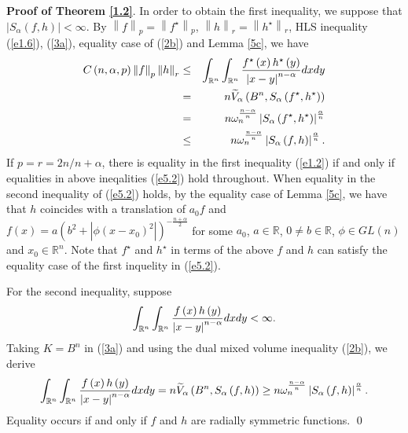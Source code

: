 \documentclass[preprint,12pt]{elsarticle}
\begin{document}
\noindent\textbf{Proof of Theorem \ref{1.2}}.
In order to obtain the first inequality, we suppose that $\left | S_{\alpha }\left ( f,h \right )   \right |< \infty $. By $\left \| f \right \|_{p}=\left \| f^{\star }  \right \|_{p}$, $\left \| h \right \|_{r}=\left \| h^{\star }  \right \|_{r} $, HLS inequality (\ref{e1.6}), (\ref{3a}), equality case of (\ref{2b}) and Lemma \ref{5c}, we have
\begin{eqnarray}\label{e5.2}
C\left ( n,\alpha ,p \right )\left \| f \right \|_{p}\left \| h \right \|_{r}&\le&\int_{\mathbb{R}^n}\int_{\mathbb{R}^n}\frac{f^{\star } \left ( x \right )h^{\star } \left ( y \right )  }{\left | x-y \right |^{n-\alpha }  }dxdy\notag\\
&=&n\widetilde{V}_{\alpha } \left ( B^{n},S_{\alpha  }\left ( f^{\star },h^{\star }   \right )    \right )\notag\\
&=& n\omega^{\frac{n-\alpha }{n} }_{n}\left | S_{\alpha  }\left ( f^{\star } ,h^{\star }  \right )   \right |^{\frac{\alpha }{n} }\notag\\
&\le&n\omega^{\frac{n-\alpha }{n} }_{n}\left | S_{\alpha  }\left ( f ,h  \right )   \right |^{\frac{\alpha }{n} }.
\end{eqnarray}
If $p=r=2n/n+\alpha $, there is equality in the first inequality (\ref{e1.2}) if and only if equalities in above ineqalities (\ref{e5.2}) hold throughout. %
When equality in the second inequality of (\ref{e5.2}) holds, by  the equality case of Lemma \ref{5c}, we have  that $h$ coincides with a translation of $a_{0} f$ and $f\left ( x \right )=a\left ( b ^{2}+\left | \phi \left ( x-x_{0} \right )^{2}    \right |   \right )^{-\frac{n+\alpha }{2} }$ for some $a_{0}$, $a\in \mathbb{R}$, $0\neq b \in\mathbb{R}$, $\phi\in GL(n)$ and $x_{0}\in \mathbb{R}^n$. Note that $f^{\star }$ and $h^{\star }$ in terms of the above $f$ and $h$ can satisfy the equality case of the first inquelity in (\ref{e5.2}).

For the second inequality, suppose 
\begin{eqnarray}
\int_{\mathbb{R}^n}\int_{\mathbb{R}^n}\frac{f\left ( x \right )h\left ( y \right )  }{\left | x-y \right |^{n-\alpha } }dxdy  < \infty .\notag
\end{eqnarray}
Taking $K=B^{n} $ in (\ref{3a}) and using the dual mixed volume inequality (\ref{2b}), we derive
\begin{eqnarray}
\int_{\mathbb{R}^n}\int_{\mathbb{R}^n}\frac{f\left ( x \right )h\left ( y \right )  }{\left | x-y \right |^{n-\alpha } }dxdy=n\widetilde{V}_{\alpha  }\left ( B^{n},S_{\alpha  }\left ( f,h   \right )    \right )\ge n\omega^{\frac{n-\alpha }{n} }_{n}\left | S_{\alpha  }\left ( f,h  \right )   \right |^{\frac{\alpha }{n} }.\notag
\end{eqnarray}
Equality occurs if and only if  $f$ and $h$ are radially symmetric functions.
\qed
\end{document}
